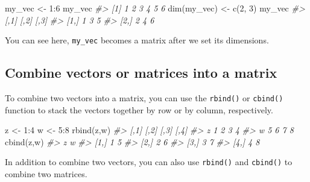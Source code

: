 \documentclass[
]{book}
\newenvironment{Shaded}{\begin{snugshade}}{\end{snugshade}}
\newcommand{\CommentTok}[1]{\textcolor[rgb]{0.56,0.35,0.01}{\textit{#1}}}
\newcommand{\DecValTok}[1]{\textcolor[rgb]{0.00,0.00,0.81}{#1}}
\newcommand{\FunctionTok}[1]{\textcolor[rgb]{0.00,0.00,0.00}{#1}}
\newcommand{\NormalTok}[1]{#1}
\newcommand{\OtherTok}[1]{\textcolor[rgb]{0.56,0.35,0.01}{#1}}
\newcommand{\SpecialCharTok}[1]{\textcolor[rgb]{0.00,0.00,0.00}{#1}}
\begin{document}
\begin{Shaded}
\begin{Highlighting}[]
\NormalTok{my\_vec }\OtherTok{\textless{}{-}} \DecValTok{1}\SpecialCharTok{:}\DecValTok{6}
\NormalTok{my\_vec}
\CommentTok{\#\textgreater{} [1] 1 2 3 4 5 6}
\FunctionTok{dim}\NormalTok{(my\_vec) }\OtherTok{\textless{}{-}} \FunctionTok{c}\NormalTok{(}\DecValTok{2}\NormalTok{, }\DecValTok{3}\NormalTok{)}
\NormalTok{my\_vec}
\CommentTok{\#\textgreater{}      [,1] [,2] [,3]}
\CommentTok{\#\textgreater{} [1,]    1    3    5}
\CommentTok{\#\textgreater{} [2,]    2    4    6}
\end{Highlighting}
\end{Shaded}

You can see here, \texttt{my\_vec} becomes a matrix after we set its dimensions.

\hypertarget{combine-vectors}{%
\subsection{Combine vectors or matrices into a matrix}\label{combine-vectors}}

To combine two vectors into a matrix, you can use the \texttt{rbind()} or \texttt{cbind()} function to stack the vectors together by row or by column, respectively.

\begin{Shaded}
\begin{Highlighting}[]
\NormalTok{z }\OtherTok{\textless{}{-}} \DecValTok{1}\SpecialCharTok{:}\DecValTok{4}
\NormalTok{w }\OtherTok{\textless{}{-}} \DecValTok{5}\SpecialCharTok{:}\DecValTok{8}
\FunctionTok{rbind}\NormalTok{(z,w)}
\CommentTok{\#\textgreater{}   [,1] [,2] [,3] [,4]}
\CommentTok{\#\textgreater{} z    1    2    3    4}
\CommentTok{\#\textgreater{} w    5    6    7    8}
\FunctionTok{cbind}\NormalTok{(z,w)}
\CommentTok{\#\textgreater{}      z w}
\CommentTok{\#\textgreater{} [1,] 1 5}
\CommentTok{\#\textgreater{} [2,] 2 6}
\CommentTok{\#\textgreater{} [3,] 3 7}
\CommentTok{\#\textgreater{} [4,] 4 8}
\end{Highlighting}
\end{Shaded}

In addition to combine two vectors, you can also use \texttt{rbind()} and \texttt{cbind()} to combine two matrices.
\end{document}
